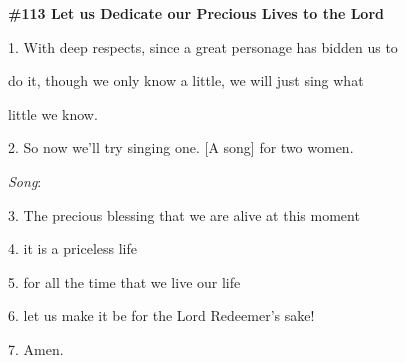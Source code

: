 
{\textbf{\#113 Let us Dedicate our Precious Lives to the Lord }}

{1. With deep respects, since a great personage has bidden us to     }

{do it, though we only know a little, we will just sing what     }

{little we know.}

{2. So now we'll try singing one. [A song] for two women.}

{\textit{Song}}{:}

{3. The precious blessing that we are alive at this moment}

{4. it is a priceless life}

{5. for all the time that we live our life}

{6. let us make it be for the Lord Redeemer's sake!}

{7. Amen.}


